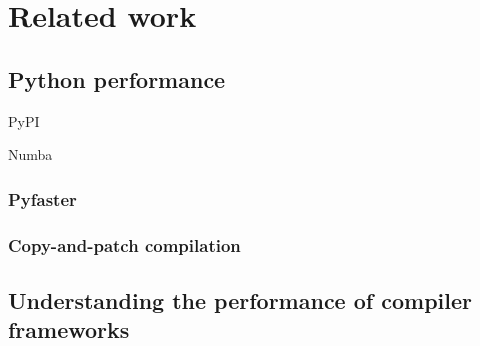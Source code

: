 \chapter{Related work}
\label{chap:related-work}

%
%

\section{Python performance}
\label{sec:python-performance}


PyPI

Numba

\subsection{Pyfaster}
\label{ssec:pyfaster}

\subsection{Copy-and-patch compilation}
\label{ssec:copy-and-patch-compilation}

\section{Understanding the performance of compiler frameworks}
\label{sec:understanding-framework-performance}

